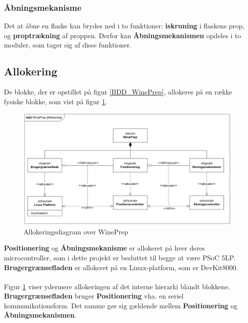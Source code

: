 \subsubsection{Åbningsmekanisme}
Det at åbne en flaske kan brydes ned i to funktioner: \textbf{iskruning} i flaskens prop, og \textbf{proptrækning} af proppen. Derfor kan \textbf{Åbningsmekanismen} opdeles i to moduler, som tager sig af disse funktioner.

\subsection{Allokering}
De blokke, der er opstillet på figur \ref{BDD_WinePrep}, allokeres på en række fysiske blokke, som vist på figur \ref{Allokering_WinePrep}.

\begin{figure}[H]
	\centerline{\includegraphics[scale=0.33]{tex/Arkitektur/Diagrammer/Allokering_WinePrep_to_MC}}
	\caption{Allokeringsdiagram over WinePrep}
	\label{Allokering_WinePrep}
\end{figure}

\noindent\textbf{Positionering} og \textbf{Åbningsmekanisme} er allokeret på hver deres microcontroller, som i dette projekt er besluttet til begge at være PSoC 5LP. \textbf{Brugergrænsefladen} er allokeret på en Linux-platform, som er DevKit8000.
\\
\\
\noindent Figur \ref{Allokering_WinePrep} viser ydermere allokeringen af det interne hierarki blandt blokkene. \textbf{Brugergrænsefladen} bruger \textbf{Positionering} vha. en seriel kommunikationsform. Det samme gør sig gældende mellem \textbf{Positionering} og \textbf{Åbningsmekanismen}.